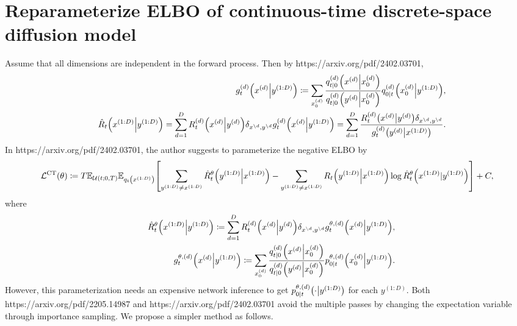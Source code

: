 \documentclass[10pt]{article}
\begin{document}
\section{Reparameterize ELBO of continuous-time discrete-space diffusion model}

Assume that all dimensions are independent in the forward process. Then by https://arxiv.org/pdf/2402.03701,
\begin{eqnarray}\label{EqDivParaHatR}
  &&g^{(d)}_t\qty(x^{(d)}\middle|y^{(1:D)})\coloneq\sum_{x^{(d)}_0}\frac{q^{(d)}_{t|0}\qty(x^{(d)}\middle|x^{(d)}_0)}{q^{(d)}_{t|0}\qty(y^{(d)}\middle|x^{(d)}_0)}q^{(d)}_{0|t}\qty(x^{(d)}_0\middle| y^{(1:D)}),\\
  &&\hat{R}_t\qty(x^{(1:D)}\middle|y^{(1:D)})=\sum_{d=1}^D R^{(d)}_t\qty(x^{(d)}\middle| y^{(d)})\delta_{x^{\setminus d},y^{\setminus d}} g^{(d)}_t\qty(x^{(d)}\middle|y^{(1:D)})=\sum_{d=1}^D \frac{R^{(d)}_t\qty(x^{(d)}\middle| y^{(d)})\delta_{x^{\setminus d},y^{\setminus d}}}{g^{(d)}_t\qty(y^{(d)}\middle|x^{(1:D)})}.
\end{eqnarray}
In https://arxiv.org/pdf/2402.03701, the author suggests to parameterize the negative ELBO by
\begin{eqnarray*}
  \mathcal{L}^\text{CT}(\theta)\coloneq T\mathbb{E}_{\mathcal{U}(t;0,T)}\mathbb{E}_{q_t\qty(x^{(1:D)})}\qty[\sum_{y^{(1:D)}\neq x^{(1:D)}}\hat{R}_t^\theta\qty(y^{(1:D)}\middle|x^{(1:D)}) - \sum_{y^{(1:D)}\neq x^{(1:D)}}R_t\qty(y^{(1:D)}\middle|x^{(1:D)})\log\hat{R}_t^\theta\qty(x^{(1:D)}|y^{(1:D)})] + C,
\end{eqnarray*}
where
\begin{eqnarray*}
  &&\hat{R}^\theta_t\qty(x^{(1:D)}\middle|y^{(1:D)})\coloneqq\sum_{d=1}^D R^{(d)}_t\qty(x^{(d)}\middle| y^{(d)})\delta_{x^{\setminus d},y^{\setminus d}} g^{\theta,(d)}_t\qty(x^{(d)}\middle|y^{(1:D)}),\\
  &&g^{\theta,(d)}_t\qty(x^{(d)}\middle|y^{(1:D)})\coloneq\sum_{x^{(d)}_0}\frac{q^{(d)}_{t|0}\qty(x^{(d)}\middle|x^{(d)}_0)}{q^{(d)}_{t|0}\qty(y^{(d)}\middle|x^{(d)}_0)}p^{\theta,(d)}_{0|t}\qty(x^{(d)}_0\middle| y^{(1:D)}).
\end{eqnarray*}
However, this parameterization needs an expensive network inference to get $p^{\theta,(d)}_{0|t}\qty(\cdot\middle|y^{(1:D)})$ for each $y^{(1:D)}$. Both https://arxiv.org/pdf/2205.14987 and https://arxiv.org/pdf/2402.03701 avoid the multiple passes by changing the expectation variable
through importance sampling. We propose a simpler method as follows.
\end{document}

